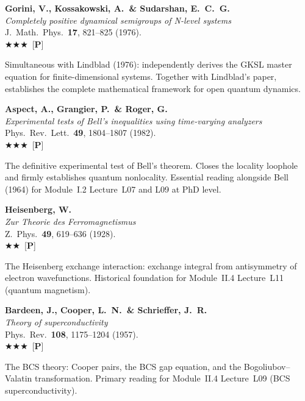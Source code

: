 \documentclass[11pt,a4paper]{article}
\newcommand{\essential}{$\bigstar\bigstar\bigstar$}
\newcommand{\recommended}{$\bigstar\bigstar$}
\newenvironment{bibentry}[1]{\begin{tcolorbox}[entrybox=#1,top=4pt,bottom=4pt]}{\end{tcolorbox}\smallskip}
\begin{document}
\begin{bibentry}{t5light}
\textbf{Gorini, V., Kossakowski, A.\ \& Sudarshan, E.~C.~G.}\\
\textit{Completely positive dynamical semigroups of N-level systems}\\
J.~Math.~Phys.~\textbf{17}, 821--825 (1976).\\[3pt]
\essential\ [\textbf{P}]\\[3pt]
\begin{tcolorbox}[annotbox]
Simultaneous with Lindblad (1976): independently derives the GKSL master equation
for finite-dimensional systems. Together with Lindblad's paper, establishes the
complete mathematical framework for open quantum dynamics.
\end{tcolorbox}
\end{bibentry}

\begin{bibentry}{t5light}
\textbf{Aspect, A., Grangier, P.\ \& Roger, G.}\\
\textit{Experimental tests of Bell's inequalities using time-varying analyzers}\\
Phys.~Rev.~Lett.~\textbf{49}, 1804--1807 (1982).\\[3pt]
\essential\ [\textbf{P}]\\[3pt]
\begin{tcolorbox}[annotbox]
The definitive experimental test of Bell's theorem. Closes the locality loophole
and firmly establishes quantum nonlocality. Essential reading alongside Bell (1964)
for Module~I.2 Lecture~L07 and L09 at PhD level.
\end{tcolorbox}
\end{bibentry}

\begin{bibentry}{t5light}
\textbf{Heisenberg, W.}\\
\textit{Zur Theorie des Ferromagnetismus}\\
Z.~Phys.~\textbf{49}, 619--636 (1928).\\[3pt]
\recommended\ [\textbf{P}]\\[3pt]
\begin{tcolorbox}[annotbox]
The Heisenberg exchange interaction: exchange integral from antisymmetry of
electron wavefunctions. Historical foundation for Module~II.4 Lecture~L11
(quantum magnetism).
\end{tcolorbox}
\end{bibentry}

\begin{bibentry}{t5light}
\textbf{Bardeen, J., Cooper, L.~N.\ \& Schrieffer, J.~R.}\\
\textit{Theory of superconductivity}\\
Phys.~Rev.~\textbf{108}, 1175--1204 (1957).\\[3pt]
\essential\ [\textbf{P}]\\[3pt]
\begin{tcolorbox}[annotbox]
The BCS theory: Cooper pairs, the BCS gap equation, and the Bogoliubov--Valatin
transformation. Primary reading for Module~II.4 Lecture~L09 (BCS superconductivity).
\end{tcolorbox}
\end{bibentry}
\end{document}
